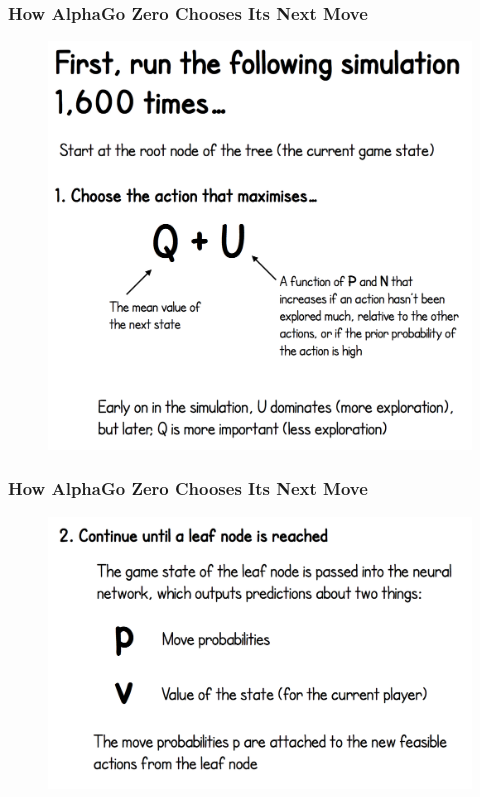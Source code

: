 \documentclass[notheorems, aspectratio=54]{beamer}
\begin{document}
\begin{frame}
    \frametitle{How AlphaGo Zero Chooses Its Next Move}

    \begin{figure}
        \includegraphics[height=0.8\textheight]{fig/alpha_mcts1.png}
    \end{figure}
\end{frame}

\begin{frame}
    \frametitle{How AlphaGo Zero Chooses Its Next Move}

    \begin{figure}
        \includegraphics[height=0.7\textheight]{fig/alpha_mcts2.png}
    \end{figure}
\end{frame}
\end{document}
